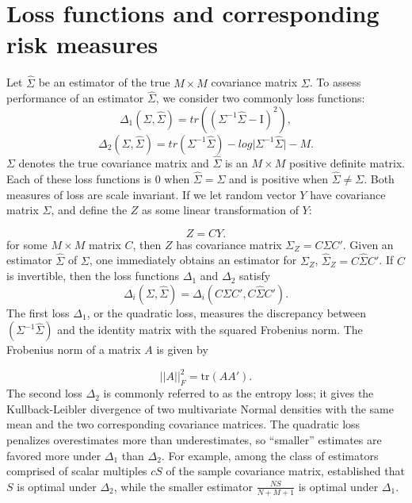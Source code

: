 \section{Loss functions and corresponding risk measures}
Let $\hat{\Sigma}$ be an estimator of the true $M \times M$ covariance matrix $\Sigma$. To assess performance of an estimator $\hat{\Sigma}$, we consider two commonly loss functions:
\begin{equation} \label{eq:quad-loss}
\Delta_1\left(\Sigma,\hat{\Sigma} \right) = tr\left(\left( \Sigma^{-1} \hat{\Sigma} - \mathrm{I}\right)^2 \right),
\end{equation}
\noindent
\begin{equation} \label{eq:entropy-loss}
\Delta_2\left(\Sigma,\hat{\Sigma}\right) = tr\left( \Sigma^{-1} \hat{\Sigma} \right) - log \vert \Sigma^{-1} \hat{\Sigma} \vert - M.
\end{equation}
\noindent
$\Sigma$ denotes the true covariance matrix and $\hat{\Sigma}$ is an $M \times M$ positive definite matrix. Each of these loss functions is $0$ when $\hat{\Sigma} = \Sigma$ and is positive when $\hat{\Sigma} \ne \Sigma$. Both measures of loss are scale invariant. If we let random vector $Y$ have covariance matrix $\Sigma$, and define the $Z$ as some linear transformation of $Y$:

\[
Z = CY. 
\]
\noindent
for some $M \times M$ matrix $C$,  then $Z$ has covariance matrix $\Sigma_Z = C \Sigma C'$. Given an estimator $\hat{\Sigma}$ of $\Sigma$, one immediately obtains an estimator for $\Sigma_Z$, $\hat{\Sigma}_Z = C \hat{\Sigma} C'$. If $C$ is invertible, then the loss functions $\Delta_1$ and $\Delta_2$ satisfy
\[
\Delta_i\left(\Sigma,\hat{\Sigma}\right) = \Delta_i\left(C \Sigma C', C \hat{\Sigma}C' \right). 
\]
\noindent
The first loss $\Delta_1$, or the quadratic loss, measures the discrepancy between $\left(\Sigma^{-1} \hat{\Sigma}\right)$ and the identity matrix with the squared Frobenius norm. The Frobenius norm of a matrix $A$ is given by 

\[
\vert \vert A \vert \vert_F^2 = \mbox{tr}\left(A A'\right).
\]
\noindent
The second loss $\Delta_2$ is commonly referred to as the entropy loss; it gives the Kullback-Leibler divergence of two multivariate Normal densities with the same mean and the two corresponding covariance matrices. The quadratic loss penalizes overestimates more than underestimates, so ``smaller'' estimates are favored more under $\Delta_1$ than $\Delta_2$. For example, among the class of estimators comprised of scalar multiples $cS$ of the sample covariance matrix, \cite{haff1980empirical} established that $S$ is optimal under $\Delta_2$, while the smaller estimator $\frac{NS}{N+M+1}$ is optimal under $\Delta_1$. 

